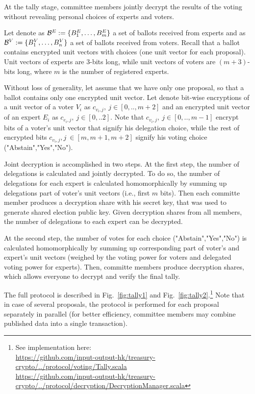At the tally stage, committee members jointly decrypt the results of the voting without revealing personal choices of experts and voters. 

Let denote as $\mathcal{B}^E:=\{B^E_1,\ldots, B^E_m \}$ a set of ballots received from experts and as $\mathcal{B}^V:=\{B^V_1,\ldots, B^V_n \}$ a set of ballots received from voters. Recall that a ballot contains encrypted unit vectors with choices (one unit vector for each proposal). Unit vectors of experts are $3$-bits long, while unit vectors of voters are $(m+3)$-bits long, where $m$ is the number of registered experts.

Without loss of generality, let assume that we have only one proposal, so that a ballot contains only one encrypted unit vector. Let denote bit-wise encryptions of a unit vector of a voter $V_i$ as $c_{v_i,j},\ j\in [0,..,m+2]$ and an encrypted unit vector of an expert $E_i$ as $c_{e_i,j},\ j\in [0,..2]$. Note that $c_{v_i,j},\ j\in [0,..,m-1]$ encrypt bits of a voter's unit vector that signify his delegation choice, while the rest of encrypted bits $c_{v_i,j},j\ \in [m,m+1,m+2]$ signify his voting choice ("Abstain","Yes","No").

Joint decryption is accomplished in two steps. At the first step, the number of delegations is calculated and jointly decrypted. To do so, the number of delegations for each expert is calculated homomorphically by summing up delegations part of voter's unit vectors (i.e., first $m$ bits). Then each committe member produces a decryption share with his secret key, that was used to generate shared election public key. Given decryption shares from all members, the number of delegations to each expert can be decrypted.

At the second step, the number of votes for each choice ("Abstain","Yes","No") is calculated homomorphically by summing up corresponding part of voter's and expert's unit vectors (weighed by the voting power for voters and delegated voting power for experts). Then, committe members produce decryption shares, which allows everyone to decrypt and verify the final tally.

The full protocol is described in Fig.~\ref{fig:tally1} and Fig.~\ref{fig:tally2}.\footnote{See implementation here:\\ \href{https://github.com/input-output-hk/treasury-crypto/blob/master/src/main/scala/io/iohk/protocol/voting/Tally.scala}{https://github.com/input-output-hk/treasury-crypto/../protocol/voting/Tally.scala}\\ \href{https://github.com/input-output-hk/treasury-crypto/blob/master/src/main/scala/io/iohk/protocol/decryption/DecryptionManager.scala}{https://github.com/input-output-hk/treasury-crypto/../protocol/decryption/DecryptionManager.scala}} Note that in case of several proposals, the protocol is performed for each proposal separately in parallel (for better efficiency, committee members may combine published data into a single transaction).


